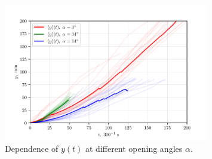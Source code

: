 \begin{figure}[htbp]
	\centering
	\includegraphics[width=0.8\textwidth]{figures/2)_y(t).pdf}
	\caption{Dependence of $ y (t) $ at different opening angles $\alpha$.}
	\label{fig:label}
\end{figure}